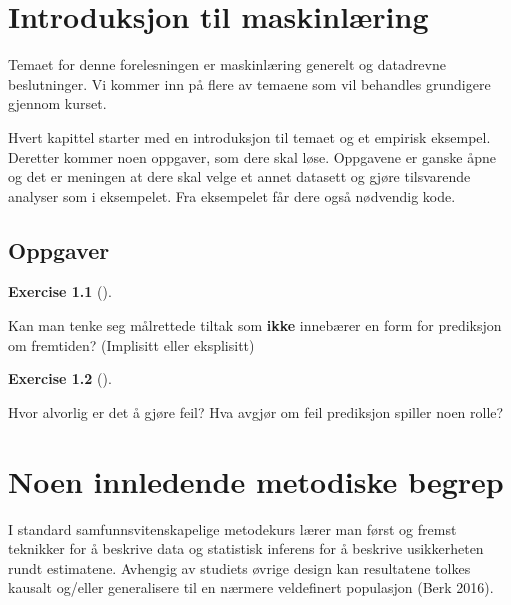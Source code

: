\documentclass[
  letterpaper,
  DIV=11,
  numbers=noendperiod]{scrreprt}
\theoremstyle{definition}
\newtheorem{exercise}{Exercise}[chapter]
\theoremstyle{remark}
\begin{document}
\hypertarget{introduksjon-til-maskinluxe6ring}{%
\chapter{Introduksjon til
maskinlæring}\label{introduksjon-til-maskinluxe6ring}}

Temaet for denne forelesningen er maskinlæring generelt og datadrevne
beslutninger. Vi kommer inn på flere av temaene som vil behandles
grundigere gjennom kurset.

Hvert kapittel starter med en introduksjon til temaet og et empirisk
eksempel. Deretter kommer noen oppgaver, som dere skal løse. Oppgavene
er ganske åpne og det er meningen at dere skal velge et annet datasett
og gjøre tilsvarende analyser som i eksempelet. Fra eksempelet får dere
også nødvendig kode.

\hypertarget{oppgaver}{%
\section{Oppgaver}\label{oppgaver}}

\leavevmode{}%
\begin{exercise}[]\label{exr-sepaa}

Kan man tenke seg målrettede tiltak som \textbf{ikke} innebærer en form
for prediksjon om fremtiden? (Implisitt eller eksplisitt)

\end{exercise}

\leavevmode{}%
\begin{exercise}[]\label{exr-feil}

Hvor alvorlig er det å gjøre feil? Hva avgjør om feil prediksjon spiller
noen rolle?

\end{exercise}


\hypertarget{noen-innledende-metodiske-begrep}{%
\chapter{Noen innledende metodiske
begrep}\label{noen-innledende-metodiske-begrep}}

I standard samfunnsvitenskapelige metodekurs lærer man først og fremst
teknikker for å beskrive data og statistisk inferens for å beskrive
usikkerheten rundt estimatene. Avhengig av studiets øvrige design kan
resultatene tolkes kausalt og/eller generalisere til en nærmere
veldefinert populasjon (Berk 2016).
\end{document}
